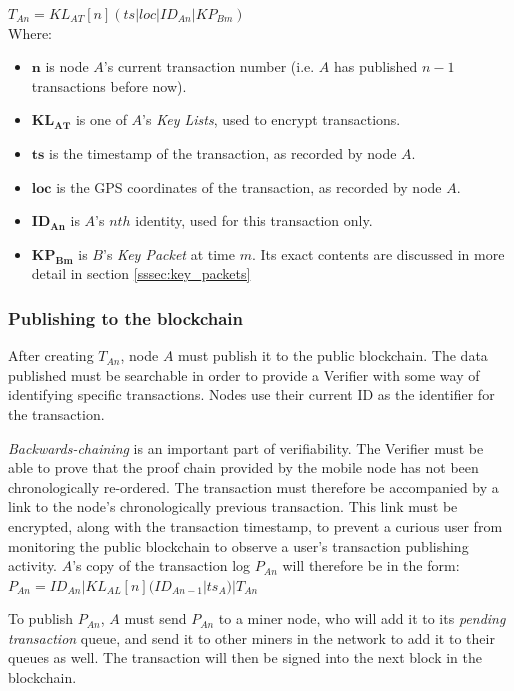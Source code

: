 $T_{An} = KL_{AT}[n](ts|loc|ID_{An}|KP_{Bm})$
\\

Where:
\begin{itemize}[noitemsep,topsep=0pt]
	\item[] $\mathbf{n}$ is node $A$'s current transaction number (i.e. $A$ has published $n-1$ transactions before now).
	\item[] $\mathbf{KL_{AT}}$ is one of $A$'s \textit{Key Lists}, used to encrypt transactions.	
	\item[] $\mathbf{ts}$ is the timestamp of the transaction, as recorded by node $A$.
	\item[] $\mathbf{loc}$ is the GPS coordinates of the transaction, as recorded by node $A$.
	\item[] $\mathbf{ID_{An}}$ is $A$'s $nth$ identity, used for this transaction only.
	\item[] $\mathbf{KP_{Bm}}$ is $B$'s \textit{Key Packet} at time $m$. Its exact contents are discussed in more detail in section \ref{sssec:key_packets}
\end{itemize}

\subsubsection{Publishing to the blockchain}
After creating $T_{An}$, node $A$ must publish it to the public blockchain. The data published must be searchable in order to provide a Verifier with some way of identifying specific transactions. Nodes use their current ID as the identifier for the transaction.

\textit{Backwards-chaining} is an important part of verifiability. The Verifier must be able to prove that the proof chain provided by the mobile node has not been chronologically re-ordered. The transaction must therefore be accompanied by a link to the node's chronologically previous transaction. This link must be encrypted, along with the transaction timestamp, to prevent a curious user from monitoring the public blockchain to observe a user's transaction publishing activity. $A$'s copy of the transaction log $P_{An}$ will therefore be in the form:
\\

$P_{An} = ID_{An}|KL_{AL}[n](ID_{An-1}|ts_A)|T_{An}$

\null
To publish $P_{An}$, $A$ must send $P_{An}$ to a miner node, who will add it to its \textit{pending transaction} queue, and send it to other miners in the network to add it to their queues as well. The transaction will then be signed into the next block in the blockchain.

